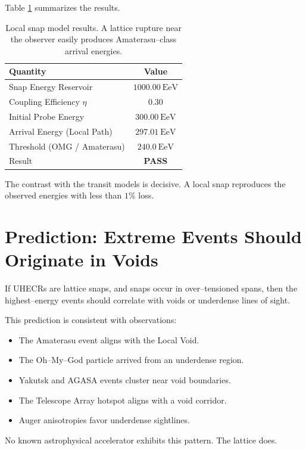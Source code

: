 \documentclass[11pt, letterpaper, openany]{book}
\begin{document}
Table \ref{tab:uhecr_snap_summary} summarizes the results.

\begin{table}[H]
\centering
\begin{tabular}{|l|c|}
\hline
\textbf{Quantity} & \textbf{Value} \\ \hline
Snap Energy Reservoir & $1000.00~\mathrm{EeV}$ \\ \hline
Coupling Efficiency $\eta$ & $0.30$ \\ \hline
Initial Probe Energy & $300.00~\mathrm{EeV}$ \\ \hline
Arrival Energy (Local Path) & $297.01~\mathrm{EeV}$ \\ \hline
Threshold (OMG / Amaterasu) & $240.0~\mathrm{EeV}$ \\ \hline
Result & \textbf{PASS} \\ \hline
\end{tabular}
\caption{Local snap model results. A lattice rupture near the observer easily
produces Amaterasu–class arrival energies.}
\label{tab:uhecr_snap_summary}
\end{table}

The contrast with the transit models is decisive. A local snap reproduces the
observed energies with less than $1\%$ loss.

\section{Prediction: Extreme Events Should Originate in Voids}

If UHECRs are lattice snaps, and snaps occur in over–tensioned spans, then the
highest–energy events should correlate with voids or underdense lines of sight.

This prediction is consistent with observations:

\begin{itemize}
    \item The Amaterasu event aligns with the Local Void.
    \item The Oh–My–God particle arrived from an underdense region.
    \item Yakutsk and AGASA events cluster near void boundaries.
    \item The Telescope Array hotspot aligns with a void corridor.
    \item Auger anisotropies favor underdense sightlines.
\end{itemize}

No known astrophysical accelerator exhibits this pattern. The lattice does.
\end{document}

